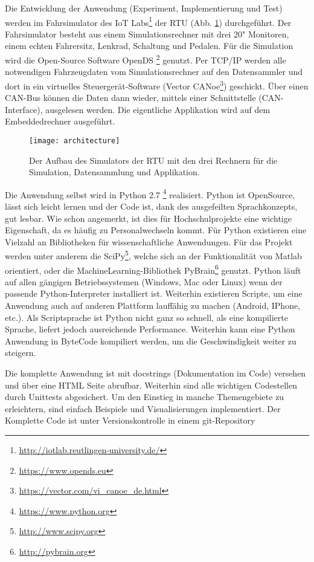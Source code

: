 \label{chap:infrastructure}
Die Entwicklung der Anwendung (Experiment, Implementierung und Test) werden im Fahrsimulator des IoT Labs\footnote{\url{http://iotlab.reutlingen-university.de/}} der \acl{RTU} (Abb. \ref{fig:architecure}) durchgeführt. 
Der Fahrsimulator besteht aus einem Simulationsrechner mit drei 20" Monitoren, einem echten Fahrersitz, Lenkrad, Schaltung und Pedalen. Für die Simulation wird die Open-Source Software OpenDS \footnote{\url{https://www.opends.eu}} genutzt. Per TCP/IP werden alle notwendigen Fahrzeugdaten vom Simulationsrechner auf den Datensammler und dort in ein virtuelles Steuergerät-Software (Vector CANoe\footnote{\url{https://vector.com/vi_canoe_de.html}}) geschickt. Über einen CAN-Bus können die Daten dann wieder, mittels einer Schnittstelle (CAN-Interface), ausgelesen werden. Die eigentliche Applikation wird auf dem Embeddedrechner ausgeführt.

\begin{figure}[h] 
  \begin{center}
    \texttt{[image: architecture]}
    \caption[Aufbau des Simulators]{Der Aufbau des Simulators der \acl{RTU} mit den drei Rechnern für die Simulation, Datensammlung und Applikation. \label{fig:architecure}}
  \end{center}
\end{figure}

Die Anwendung selbst wird in Python 2.7 \footnote{\url{https://www.python.org}} realisiert. Python ist OpenSource, lässt sich leicht lernen und der Code ist, dank des ausgefeilten Sprachkonzepts, gut lesbar. Wie schon angemerkt, ist dies für Hochschulprojekte eine wichtige Eigenschaft, da es häufig zu Personalwechseln kommt. Für Python existieren eine Vielzahl an Bibliotheken für wissenschaftliche Anwendungen. Für das Projekt werden unter anderem die SciPy\footnote{\url{http://www.scipy.org}}, welche sich an der Funktionalität von Matlab orientiert, oder die MachineLearning-Bibliothek PyBrain\footnote{\url{http://pybrain.org}} genutzt. Python läuft auf allen gängigen Betriebssystemen (Windows, Mac oder Linux) wenn der passende Python-Interpreter installiert ist. Weiterhin existieren Scripte, um eine Anwendung auch auf anderen Plattform lauffähig zu machen (Android, IPhone, etc.). Als Scriptsprache ist Python nicht ganz so schnell, als eine kompilierte Sprache, liefert jedoch ausreichende Performance. Weiterhin kann eine Python Anwendung in ByteCode kompiliert werden, um die Geschwindigkeit weiter zu steigern. 

Die komplette Anwendung ist mit docstrings (Dokumentation im Code) versehen und über eine HTML Seite abrufbar. Weiterhin sind alle wichtigen Codestellen durch Unittests abgesichert. Um den Einstieg in manche Themengebiete zu erleichtern, sind einfach Beispiele und Visualisierungen implementiert. Der Komplette Code ist unter Versionskontrolle in einem git-Repository

